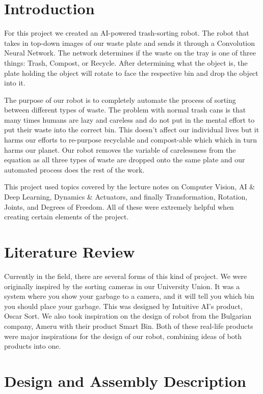 \documentclass[12pt]{article}
\begin{document}
\section*{Introduction}

For this project we created an AI-powered trash-sorting robot. The robot that takes in top-down images of our waste plate and sends it through a Convolution Neural Network. The network determines if the waste on the tray is one of three things: Trash, Compost, or Recycle. After determining what the object is, the plate holding the object will rotate to face the respective bin and drop the object into it.

The purpose of our robot is to completely automate the process of sorting between different types of waste. The problem with normal trash cans is that many times humans are lazy and careless and do not put in the mental effort to put their waste into the correct bin. This doesn't affect our individual lives but it harms our efforts to re-purpose recyclable and compost-able which which in turn harms our planet. Our robot removes the variable of carelessness from the equation as all three types of waste are dropped onto the same plate and our automated process does the rest of the work.

This project used topics covered by the lecture notes on Computer Vision, AI \& Deep Learning, Dynamics \& Actuators, and finally Transformation, Rotation, Joints, and Degrees of Freedom. All of these were extremely helpful when creating certain elements of the project.

\section*{Literature Review}
Currently in the field, there are several forms of this kind of project. We were originally inspired by the sorting cameras in our University Union. It was a system where you show your garbage to a camera, and it will tell you which bin you should place your garbage. This was designed by Intuitive AI's product, Oscar Sort\cite{sort_2014}.
We also took inspiration on the design of robot from the Bulgarian company, Ameru\cite{ameru_2025} with their product Smart Bin.
Both of these real-life products were major inspirations for the design of our robot, combining ideas of both products into one.

\section*{Design and Assembly Description}
\end{document}

